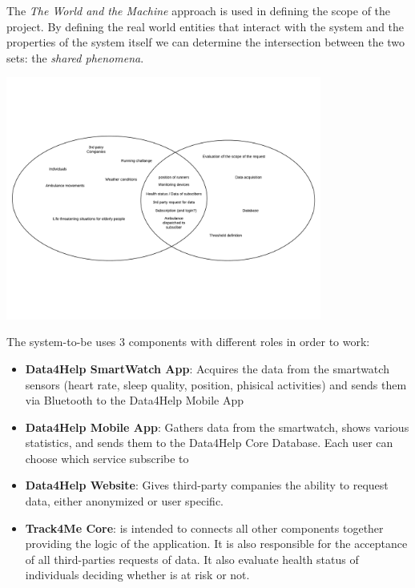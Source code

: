 

The \textit{The World and the Machine} approach is used in defining the scope of the project.
By defining the real world entities that interact with the system and the properties of the system itself we can determine the intersection between the two sets: the \textit{shared phenomena}.
\begin{center}
    \includegraphics[height=8cm,keepaspectratio]{assets/twatm.pdf}
\end{center}

The system-to-be uses 3 components with different roles in order to work:
\begin{itemize}
    \item \textbf{Data4Help SmartWatch App}: Acquires the data from the smartwatch sensors (heart rate, sleep quality, position, phisical activities) and sends them via Bluetooth to the Data4Help Mobile App
    \item \textbf{Data4Help Mobile App}: Gathers data from the smartwatch, shows various statistics, and sends them to the Data4Help Core Database. Each user can choose which service subscribe to
    \item \textbf{Data4Help Website}: Gives third-party companies the ability to request data, either anonymized or user specific.
    \item \textbf{Track4Me Core}: is intended to connects all other components together providing the logic of the application. It is also responsible for the acceptance of all third-parties requests of data. It also evaluate health status of individuals deciding whether is at risk or not.
\end{itemize}

